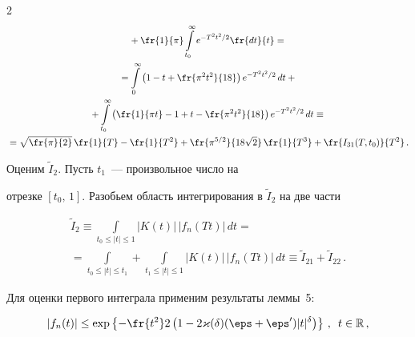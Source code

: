 \begin{multicols}{2}
\begin{multline*}
{}+


\fr{1}{\pi}\int\limits_{t_0}^{\infty}e^{-T^2t^2/2}\fr{dt}{t}={}\\


{}=\int\limits_0^\infty {\left(1-t+\fr{\pi^2t^2}{18}\right) e^{-T^2t^2/2}\,dt}+ {}\\


{}+


\int\limits_{t_0}^{\infty}\left(\fr{1}{\pi t}-1+


t-\fr{\pi^2t^2}{18}\right)e^{-T^2t^2/2}\,dt\equiv {}\\


{}\equiv \sqrt{\fr{\pi}{2}}\,\fr{1}{T}-\fr{1}{T^2}+


\fr{\pi^{5/2}}{18\sqrt2}\,\fr{1}{T^3}+\fr{I_{31}(T,t_0)}{T^2}\,.


\end{multline*}





Оценим $\widetilde I_2$. Пусть $t_1$~--- произвольное число на


отрезке $[t_0,\,1]$. Разобьем область интегрирования в $\widetilde


I_2$ на две части





\noindent


\begin{multline*}


\widetilde I_2\equiv


\int\limits_{t_0\le|t|\le1}|K(t)|\,|f_n(Tt)|\,dt={}\\[12pt]


{}=


\int\limits_{t_0\le |t|\le t_1}+


\int\limits_{t_1\le|t|\le1}|K(t)|\,|f_n(Tt)|\,dt\equiv \widetilde


I_{21}+\widetilde I_{22}\,.


\end{multline*}


Для оценки первого интеграла применим результаты леммы~5:


\begin{equation*}%


|f_n(t)|\le\exp\left\{-\fr{t^2}2\left(1-


2\varkappa(\delta)(\eps+\eps')|t|^{\delta}\right)\right\}\,,\enskip t\in\R\,,


\end{equation*}



\end{multicols}
